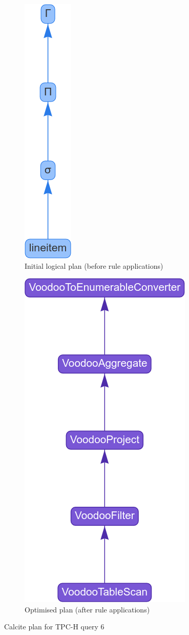 \begin{figure}[H]
    \begin{subfigure}{0.49\textwidth}
        \centering
        \includegraphics[width=0.15\linewidth]{appendix/q6-logical-plan.png}
        \caption{Initial logical plan (before rule applications)}
        \label{fig:q6-logical-plan}
    \end{subfigure}
    \begin{subfigure}{0.49\textwidth}
        \centering
        \includegraphics[width=0.45\linewidth]{appendix/q6-plan.png}
        \caption{Optimised plan (after rule applications)}
        \label{fig:q6-optimal-plan}
    \end{subfigure}
    \caption{Calcite plan for TPC-H query 6}
    \label{fig:q6-plan}
\end{figure}


